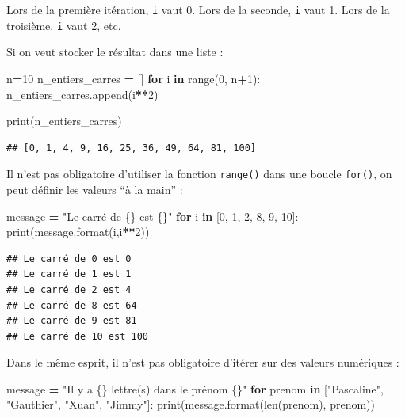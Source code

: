 \documentclass[12pt,]{book}
\newenvironment{Shaded}{\begin{snugshade}}{\end{snugshade}}
\newcommand{\KeywordTok}[1]{\textcolor[rgb]{0.13,0.29,0.53}{\textbf{#1}}}
\newcommand{\DecValTok}[1]{\textcolor[rgb]{0.00,0.00,0.81}{#1}}
\newcommand{\SpecialCharTok}[1]{\textcolor[rgb]{0.00,0.00,0.00}{#1}}
\newcommand{\StringTok}[1]{\textcolor[rgb]{0.31,0.60,0.02}{#1}}
\newcommand{\ControlFlowTok}[1]{\textcolor[rgb]{0.13,0.29,0.53}{\textbf{#1}}}
\newcommand{\OperatorTok}[1]{\textcolor[rgb]{0.81,0.36,0.00}{\textbf{#1}}}
\newcommand{\BuiltInTok}[1]{#1}
\newcommand{\NormalTok}[1]{#1}
\numberwithin{equation}{section}
\numberwithin{countremarque}{section}
\begin{document}
Lors de la première itération, \texttt{i} vaut 0. Lors de la seconde,
\texttt{i} vaut 1. Lors de la troisième, \texttt{i} vaut 2, etc.

Si on veut stocker le résultat dans une liste :

\begin{Shaded}
\begin{Highlighting}[]
\NormalTok{n}\OperatorTok{=}\DecValTok{10}
\NormalTok{n_entiers_carres }\OperatorTok{=}\NormalTok{ []}
\ControlFlowTok{for}\NormalTok{ i }\KeywordTok{in} \BuiltInTok{range}\NormalTok{(}\DecValTok{0}\NormalTok{, n}\OperatorTok{+}\DecValTok{1}\NormalTok{):}
\NormalTok{  n_entiers_carres.append(i}\OperatorTok{**}\DecValTok{2}\NormalTok{)}
  
\BuiltInTok{print}\NormalTok{(n_entiers_carres)}
\end{Highlighting}
\end{Shaded}

\begin{lstlisting}
## [0, 1, 4, 9, 16, 25, 36, 49, 64, 81, 100]
\end{lstlisting}

Il n'est pas obligatoire d'utiliser la fonction \texttt{range()} dans
une boucle \texttt{for()}, on peut définir les valeurs ``à la main'' :

\begin{Shaded}
\begin{Highlighting}[]
\NormalTok{message }\OperatorTok{=} \StringTok{"Le carré de }\SpecialCharTok{\{\}}\StringTok{ est }\SpecialCharTok{\{\}}\StringTok{"}
\ControlFlowTok{for}\NormalTok{ i }\KeywordTok{in}\NormalTok{ [}\DecValTok{0}\NormalTok{, }\DecValTok{1}\NormalTok{, }\DecValTok{2}\NormalTok{, }\DecValTok{8}\NormalTok{, }\DecValTok{9}\NormalTok{, }\DecValTok{10}\NormalTok{]:}
  \BuiltInTok{print}\NormalTok{(message.}\BuiltInTok{format}\NormalTok{(i,i}\OperatorTok{**}\DecValTok{2}\NormalTok{))}
\end{Highlighting}
\end{Shaded}

\begin{lstlisting}
## Le carré de 0 est 0
## Le carré de 1 est 1
## Le carré de 2 est 4
## Le carré de 8 est 64
## Le carré de 9 est 81
## Le carré de 10 est 100
\end{lstlisting}

Dans le même esprit, il n'est pas obligatoire d'itérer sur des valeurs
numériques :

\begin{Shaded}
\begin{Highlighting}[]
\NormalTok{message }\OperatorTok{=} \StringTok{"Il y a }\SpecialCharTok{\{\}}\StringTok{ lettre(s) dans le prénom }\SpecialCharTok{\{\}}\StringTok{"}
\ControlFlowTok{for}\NormalTok{ prenom }\KeywordTok{in}\NormalTok{ [}\StringTok{"Pascaline"}\NormalTok{, }\StringTok{"Gauthier"}\NormalTok{, }\StringTok{"Xuan"}\NormalTok{, }\StringTok{"Jimmy"}\NormalTok{]:}
  \BuiltInTok{print}\NormalTok{(message.}\BuiltInTok{format}\NormalTok{(}\BuiltInTok{len}\NormalTok{(prenom), prenom))}
\end{Highlighting}
\end{Shaded}
\end{document}
